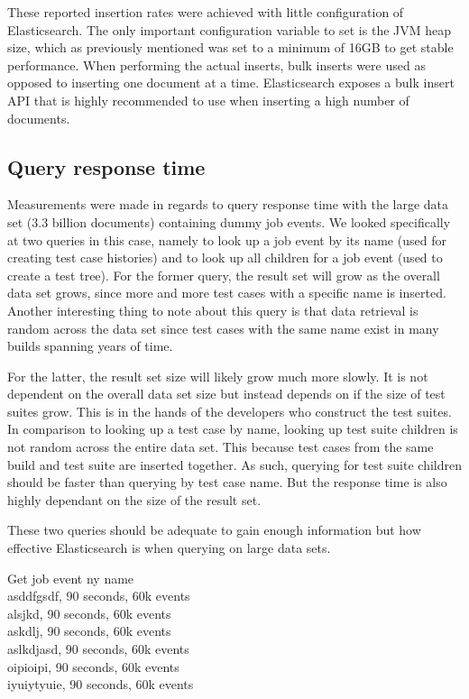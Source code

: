 These reported insertion rates were achieved with little configuration of Elasticsearch. The only important configuration variable to set is the JVM heap size, which as previously mentioned was set to a minimum of 16GB to get stable performance. When performing the actual inserts, bulk inserts were used as opposed to inserting one document at a time. Elasticsearch exposes a bulk insert API that is highly recommended to use when inserting a high number of documents.



\subsection{Query response time}

Measurements were made in regards to query response time with the large data set (3.3 billion documents) containing dummy job events. We looked specifically at two queries in this case, namely to look up a job event by its name (used for creating test case histories) and to look up all children for a job event (used to create a test tree). For the former query, the result set will grow as the overall data set grows, since more and more test cases with a specific name is inserted. Another interesting thing to note about this query is that data retrieval is random across the data set since test cases with the same name exist in many builds spanning years of time.

For the latter, the result set size will likely grow much more slowly. It is not dependent on the overall data set size but instead depends on if the size of test suites grow. This is in the hands of the developers who construct the test suites. In comparison to looking up a test case by name, looking up test suite children is not random across the entire data set. This because test cases from the same build and test suite are inserted together. As such, querying for test suite children should be faster than querying by test case name. But the response time is also highly dependant on the size of the result set.

These two queries should be adequate to gain enough information but how effective Elasticsearch is when querying on large data sets.

Get job event ny name \\
asddfgsdf, 90 seconds, 60k events \\
alsjkd, 90 seconds, 60k events \\
askdlj, 90 seconds, 60k events \\
aslkdjasd, 90 seconds, 60k events \\
oipioipi, 90 seconds, 60k events \\
iyuiytyuie, 90 seconds, 60k events \\


